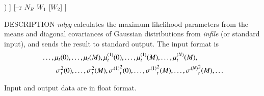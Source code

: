 \begin{synopsis}
	\item [mlpg] [ --m $M$ ] [ --l $L$ ] 
		[--d ($fn$ $|$ $d_0$ [$d_1$ $\dots$]) ]
		[--r $N_R$ $W_1$ [$W_2$] ]
	\item [\ ~~~~] [ --i $I$ ] [ --s $S$ ] [ {\em infile} ] 
\end{synopsis}

\begin{qsection}{DESCRIPTION}
	{\em mlpg} calculates the maximum likelihood parameters 
	from the means and diagonal covariances of Gaussian distributions 
	from {\em infile} (or standard input),
	and sends the result to standard output.
	The input format is
 \begin{align}
	& \dots, \mu_t(0), \dots, \mu_t(M),
		\mu^{(1)}_t(0), \dots, \mu^{(1)}_t(M),
		\dots, \mu^{(N)}_t(M),
		\notag\\
	& \qquad \sigma^2_t(0), \dots, \sigma^2_t(M),
		{\sigma^{(1)}}^2_t(0), \dots, {\sigma^{(1)}}^2_t(M),
		\dots, {\sigma^{(N)}}^2_t(M),
		\dots \notag
 \end{align}

	Input and output data are in float format.


\end{qsection}
